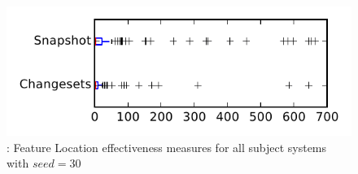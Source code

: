 
\begin{figure}
\centering
\includegraphics[height=0.4\textheight]{figures/flt_seed/rq1_tiny_30}
\caption{\rone: Feature Location effectiveness measures for all subject systems with $seed=30$}
\label{fig:flt_seed:rq1:tiny}
\end{figure}
